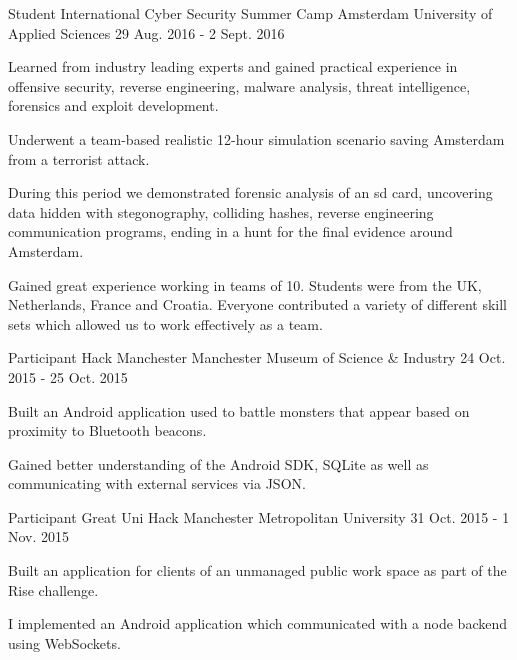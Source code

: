 \begin{cventries}
  \cventry
    {Student} %
    {International Cyber Security Summer Camp} %
    {Amsterdam University of Applied Sciences} %
    {29 Aug. 2016 - 2 Sept. 2016} %
    {
      \begin{cvitems} %
        \item {Learned from industry leading experts and gained practical experience in offensive security, reverse engineering, malware analysis, threat intelligence, forensics and exploit development.}
        \item {Underwent a team-based realistic 12-hour simulation scenario saving Amsterdam from a terrorist attack.}
        \item {During this period we demonstrated forensic analysis of an sd card, uncovering data hidden with stegonography, colliding hashes, reverse engineering communication programs, ending in a hunt for the final evidence around Amsterdam.}
        \item {Gained great experience working in teams of 10. Students were from the UK, Netherlands, France and Croatia. Everyone contributed a variety of different skill sets which allowed us to work effectively as a team.}
      \end{cvitems}
    }

  \cventry
    {Participant} %
    {Hack Manchester} %
    {Manchester Museum of Science \& Industry} %
    {24 Oct. 2015 - 25 Oct. 2015} %
    {
      \begin{cvitems} %
        \item {Built an Android application used to battle monsters that appear based on proximity to Bluetooth beacons.}
        \item {Gained better understanding of the Android SDK, SQLite as well as communicating with external services via JSON.}
      \end{cvitems}
    }

  \cventry
    {Participant} %
    {Great Uni Hack} %
    {Manchester Metropolitan University} %
    {31 Oct. 2015 - 1 Nov. 2015} %
    {
      \begin{cvitems} %
        \item {Built an application for clients of an unmanaged public work space as part of the Rise challenge.}
        \item {I implemented an Android application which communicated with a node backend using WebSockets.}
      \end{cvitems}
    }


\end{cventries}
